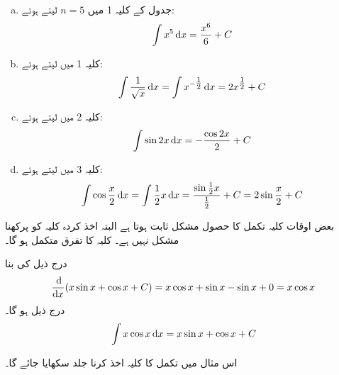 \begin{enumerate}[a.]
\item
 جدول  کے کلیہ 1 میں $n=5$ لیتے ہوئے:
\begin{align*}\int x^5\dif x=\frac{x^6}{6}+C\end{align*}

\item
کلیہ 1 میں  لیتے ہوئے:
\begin{align*}\int \frac{1}{\sqrt{x}}\dif x=\int x^{-\tfrac{1}{2}}\dif x=2x^{\tfrac{1}{2}}+C\end{align*}

\item
کلیہ 2 میں  لیتے ہوئے:
\begin{align*}\int\sin 2x\dif x=-\frac{\cos 2x}{2}+C\end{align*}

\item
کلیہ 3 میں  لیتے ہوئے:
\begin{align*}\int\cos \frac{x}{2}\dif x=\int\frac{1}{2}x\dif x=\frac{\sin \tfrac{1}{2}x}{\tfrac{1}{2}}+C=2\sin\frac{x}{2}+C\end{align*}
\end{enumerate}

بعض اوقات کلیہ تکمل کا حصول مشکل ثابت ہوتا ہے البتہ  اخذ کردہ کلیہ کو پرکھنا مشکل نہیں ہے۔ کلیہ کا تفرق متکمل ہو گا۔

درج ذیل کی بنا
\begin{align*}
\frac{\dif}{\dif x}(x\sin x+\cos x+C)=x\cos x+\sin x-\sin x+0=x\cos x
\end{align*}
درج ذیل ہو گا۔
\begin{align*}
\int x\cos x\dif x=x\sin x+\cos x+C
\end{align*}

اس مثال میں تکمل کا کلیہ اخذ کرنا جلد سکھایا جائے گا۔

